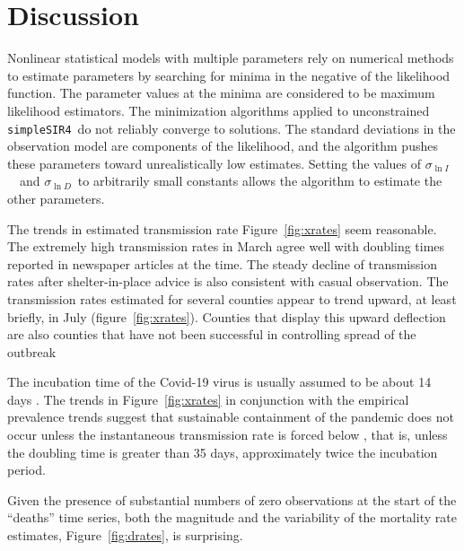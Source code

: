 \documentclass[12pt,letterpaper]{article}
\newcommand\help[1]{\color{Magenta}{\it #1 }\normalcolor}
\newcommand\SSm{{\tt simpleSIR4}}
\newcommand\slI{$\sigma_{\ln I}$\ }
\newcommand\slD{$\sigma_{\ln D}$}
\begin{document}
\section*{Discussion}

Nonlinear statistical models with multiple parameters rely
on numerical methods to estimate parameters by searching for minima
in the negative of the likelihood
function. The parameter values at the minima are considered to be
maximum likelihood estimators.  The minimization algorithms applied to
unconstrained \SSm\ do not reliably converge to solutions. The
standard deviations in the observation model are components of the
likelihood, and the algorithm pushes these parameters toward
unrealistically low estimates.  Setting the values of
\slI\ and \slD\ to arbitrarily small constants allows the
algorithm to estimate the other parameters.

The trends in estimated transmission rate Figure~\ref{fig:xrates} seem
reasonable. The extremely high transmission rates in March agree well
with doubling times reported in newspaper articles at the time.
The steady decline of transmission rates after shelter-in-place advice is 
also consistent with casual observation.
The transmission rates estimated for several counties appear to trend
upward, at least briefly, in July (figure~\ref{fig:xrates}). Counties
that display this upward deflection are also counties that have not
been successful in controlling spread of the outbreak

The incubation time of the Covid-19 virus is usually assumed to be
about 14 days \cite{someone2020}.
The trends in Figure~\ref{fig:xrates} in conjunction with the
empirical prevalence trends suggest that sustainable containment of
the pandemic does not occur unless the instantaneous transmission rate
is forced below \help{ $0.018 da^{-1}$}, that is, unless the doubling
time is greater than 35 days, approximately twice the incubation
period.

Given the presence of substantial numbers of zero observations at the
start of the ``deaths'' time series, both the magnitude and the
variability of the mortality rate estimates, Figure~\ref{fig:drates},
is surprising.



\clearpage


\clearpage
\printbibliography[title=References]
\clearpage
\end{document}
